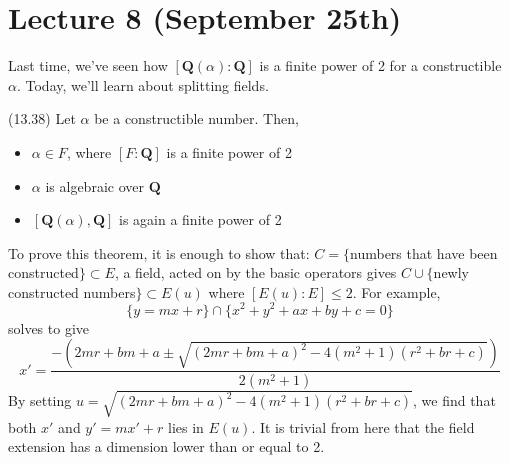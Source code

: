 \section{Lecture 8 (September 25th)}
\begin{rmk}
Last time, we've seen how $[{\bm Q}(\alpha ):{\bm Q}]$ is a finite power of 2 for a constructible $\alpha $. Today, we'll learn about splitting fields.
\end{rmk}
\vspace{2ex}
\begin{thm}
(13.38) Let $\alpha $ be a constructible number. Then,
\begin{itemize}
\item[(i)] $\alpha \in F$, where $[F:{\bm Q}]$ is a finite power of 2
\item[(ii)] $\alpha $ is algebraic over ${\bm Q}$
\item[(iii)] $[{\bm Q}(\alpha ),{\bm Q}]$ is again a finite power of 2 
\end{itemize}
\end{thm}
\vspace{2ex}
\begin{thm}
To prove this theorem, it is enough to show that: $C=\{$numbers that have been constructed$\}\subset E$, a field, acted on by the basic operators gives $C\cup\{$newly constructed numbers$\}\subset E(u)$ where $[E(u):E]\leq 2$. For example, 
\[\{y=mx+r\}\cap \{x^2+y^2+ax+by+c=0\}\]
solves to give
\[x'=\dfrac{-(2mr+ bm +a\pm \sqrt{(2mr+bm+a)^2-4(m^2+1)(r^2+br+c)})}{2(m^2+1)}\]
By setting $u=\sqrt{(2mr+b m+a)^2-4(m^2+1)(r^2+br+c)}$, we find that both $x'$ and $y'=mx'+r$ lies in $E(u)$. It is trivial from here that the field extension has a dimension lower than or equal to 2.
\end{thm}
\vspace{2ex}
